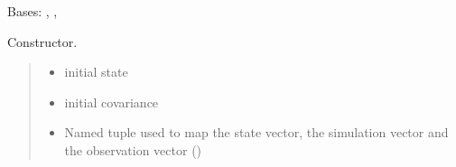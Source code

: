 \documentclass[letterpaper,10pt,english]{sphinxmanual}
\begin{document}
\begin{fulllineitems}
\label{\detokenize{GFLocalization:EKF_4DOFAUV_CtVelocityMM_DVLDepthYawOM.EKF_4DOFAUV_CtVelocityMM_DVLDepthYawOM}}
\pysigstartsignatures
{}
\pysigstopsignatures
\sphinxAtStartPar
Bases: {\hyperref[\detokenize{GFLocalization:GFLocalization.GFLocalization}]{}}, {\hyperref[\detokenize{DRLocalization:DR_4DOFAUV_DVLGyro.DR_4DOFAUV_DVLGyro}]{}}, {\hyperref[\detokenize{EKF:EKF.EKF}]{}}

\begin{fulllineitems}
\label{\detokenize{GFLocalization:EKF_4DOFAUV_CtVelocityMM_DVLDepthYawOM.EKF_4DOFAUV_CtVelocityMM_DVLDepthYawOM.__init__}}
\pysigstartsignatures
{}
\pysigstopsignatures
\sphinxAtStartPar
Constructor.
\begin{quote}\begin{description}
\begin{itemize}
\item {} 
\sphinxAtStartPar
{} \textendash{} initial state

\item {} 
\sphinxAtStartPar
{} \textendash{} initial covariance

\item {} 
\sphinxAtStartPar
{} \textendash{} Named tuple used to map the state vector, the simulation vector and the observation vector ()


\end{itemize}
\end{description}
\end{quote}
\end{fulllineitems}
\end{fulllineitems}
\end{document}

